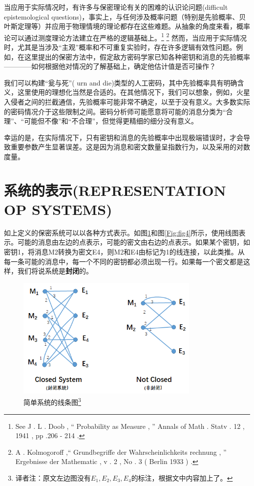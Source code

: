 \documentclass[]{article}
\begin{document}
当应用于实际情况时，有许多与保密理论有关的困难的认识论问题(difficult epistemological questions)，事实上，与任何涉及概率问题（特别是先验概率、贝叶斯定理等）并应用于物理情境的理论都存在这些难题。从抽象的角度来看，概率论可以通过测度理论方法建立在严格的逻辑基础上。\footnote{See J . L . Doob , “ Probability as Measure , ” Annals of Math . Statv . 12 , 1941 , pp .206 - 214 .} \footnote{A . Kolmogoroff ,“ Grundbegriffe der Wahrscheinlichkeits rechnung , ” Ergebnisse der Mathematic , v . 2 , No . 3 ( Berlin 1933 ) .}
然而，当应用于实际情况时，尤其是当涉及“主观”概率和不可重复实验时，存在许多逻辑有效性问题。例如，在这里提出的保密方法中，假定敌方密码学家已知各种密钥和消息的先验概率————如何根据他对情况的了解基础上，确定他估计值是否可操作？

我们可以构建“瓮与死”( urn and die)类型的人工密码，其中先验概率具有明确含义，这里使用的理想化当然是合适的。在其他情况下，我们可以想象，例如，火星入侵者之间的拦截通信，先验概率可能非常不确定，以至于没有意义。大多数实际的密码情况介于这些限制之间。密码分析师可能愿意将可能的消息分类为“合理”、“可能但不像”和“不合理”，但觉得更精细的细分没有意义。

幸运的是，在实际情况下，只有密钥和消息的先验概率中出现极端错误时，才会导致重要参数产生显著误差。这是因为消息和密文数量呈指数行为，以及采用的对数度量。

\newpage

%   
%

\section{系统的表示(REPRESENTATION OP SYSTEMS)}
如上定义的保密系统可以以各种方式表示。如图\ref{Fig:fig2}和图\ref{Fig:fig4}所示，使用线图表示。可能的消息由左边的点表示，可能的密文由右边的点表示。如果某个密钥，如密钥1，将消息M2转换为密文E4，则M2和E4由标记为1的线连接，以此类推。从每一条可能的消息中，每一个不同的密钥都必须出现一行。如果每一个密文都是这样，我们将说系统是\textbf{封闭}的。

\begin{figure}[htbp]
	\centering
	\includegraphics[width=0.8\textwidth]{fig-2.png}
	\caption[简单系统的线条图]{简单系统的线条图\footnote{译者注：原文左边图没有$E_1,E_2,E_3,E_4$的标注，根据文中内容加上了。}}
	\label{Fig:fig2}
\end{figure}
\end{document}
